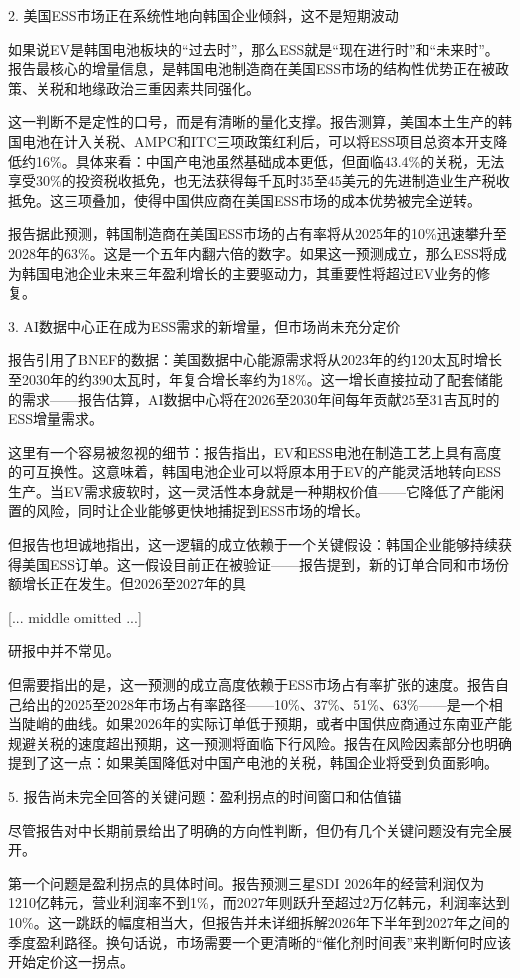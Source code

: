 \documentclass[11pt]{ctexart}
\begin{document}
2. 美国ESS市场正在系统性地向韩国企业倾斜，这不是短期波动

如果说EV是韩国电池板块的“过去时”，那么ESS就是“现在进行时”和“未来时”。报告最核心的增量信息，是韩国电池制造商在美国ESS市场的结构性优势正在被政策、关税和地缘政治三重因素共同强化。

这一判断不是定性的口号，而是有清晰的量化支撑。报告测算，美国本土生产的韩国电池在计入关税、AMPC和ITC三项政策红利后，可以将ESS项目总资本开支降低约16\%。具体来看：中国产电池虽然基础成本更低，但面临43.4\%的关税，无法享受30\%的投资税收抵免，也无法获得每千瓦时35至45美元的先进制造业生产税收抵免。这三项叠加，使得中国供应商在美国ESS市场的成本优势被完全逆转。

报告据此预测，韩国制造商在美国ESS市场的占有率将从2025年的10\%迅速攀升至2028年的63\%。这是一个五年内翻六倍的数字。如果这一预测成立，那么ESS将成为韩国电池企业未来三年盈利增长的主要驱动力，其重要性将超过EV业务的修复。

3. AI数据中心正在成为ESS需求的新增量，但市场尚未充分定价

报告引用了BNEF的数据：美国数据中心能源需求将从2023年的约120太瓦时增长至2030年的约390太瓦时，年复合增长率约为18\%。这一增长直接拉动了配套储能的需求——报告估算，AI数据中心将在2026至2030年间每年贡献25至31吉瓦时的ESS增量需求。

这里有一个容易被忽视的细节：报告指出，EV和ESS电池在制造工艺上具有高度的可互换性。这意味着，韩国电池企业可以将原本用于EV的产能灵活地转向ESS生产。当EV需求疲软时，这一灵活性本身就是一种期权价值——它降低了产能闲置的风险，同时让企业能够更快地捕捉到ESS市场的增长。

但报告也坦诚地指出，这一逻辑的成立依赖于一个关键假设：韩国企业能够持续获得美国ESS订单。这一假设目前正在被验证——报告提到，新的订单合同和市场份额增长正在发生。但2026至2027年的具

[... middle omitted ...]

研报中并不常见。

但需要指出的是，这一预测的成立高度依赖于ESS市场占有率扩张的速度。报告自己给出的2025至2028年市场占有率路径——10\%、37\%、51\%、63\%——是一个相当陡峭的曲线。如果2026年的实际订单低于预期，或者中国供应商通过东南亚产能规避关税的速度超出预期，这一预测将面临下行风险。报告在风险因素部分也明确提到了这一点：如果美国降低对中国产电池的关税，韩国企业将受到负面影响。

5. 报告尚未完全回答的关键问题：盈利拐点的时间窗口和估值锚

尽管报告对中长期前景给出了明确的方向性判断，但仍有几个关键问题没有完全展开。

第一个问题是盈利拐点的具体时间。报告预测三星SDI 2026年的经营利润仅为1210亿韩元，营业利润率不到1\%，而2027年则跃升至超过2万亿韩元，利润率达到10\%。这一跳跃的幅度相当大，但报告并未详细拆解2026年下半年到2027年之间的季度盈利路径。换句话说，市场需要一个更清晰的“催化剂时间表”来判断何时应该开始定价这一拐点。
\end{document}
